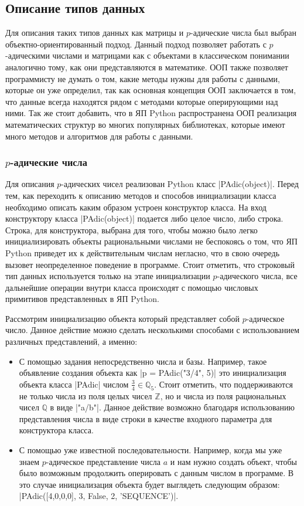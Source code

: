 \documentclass[master, och, diploma, times]{sty/SCWorks}
\theoremstyle{plain}
\theoremstyle{definition}
\numberwithin{equation}{section}
\begin{document}
\subsection{Описание типов данных}

Для описания таких типов данных как матрицы и $p$-адические числа был выбран объектно-ориентированный подход. Данный подход позволяет работать с $p$-адическими числами и матрицами как с объектами в классическом понимании аналогично тому, как они представляются в математике. ООП также позволяет программисту не думать о том, какие методы нужны для работы с данными, которые он уже определил, так как основная концепция ООП заключается в том, что данные всегда находятся рядом с методами которые оперирующими над ними. Так же стоит добавить, что в ЯП Python распространена ООП реализация математических структур во многих популярных библиотеках, которые имеют много методов и алгоритмов для работы с данными.

\subsubsection{$p$-адические числа}

Для описания $p$-адических чисел реализован Python класс |PAdic(object)|. Перед тем, как переходить к описанию методов и способов инициализации класса необходимо описать каким образом устроен конструктор класса. На вход конструктору класса |PAdic(object)| подается либо целое число, либо строка. Строка, для конструктора, выбрана для того, чтобы можно было легко инициализировать объекты рациональными числами не беспокоясь о том, что ЯП Python приведет их к действительным числам негласно, что в свою очередь вызовет неопределенное поведение в программе. Стоит отметить, что строковый тип данных используется только на этапе инициализации $p$-адического числа, все дальнейшие операции внутри класса происходят с помощью числовых примитивов представленных в ЯП Python.

Рассмотрим инициализацию объекта который представляет собой $p$-адическое число. Данное действие можно сделать несколькими способами с использованием различных представлений, а именно:

 \begin{itemize}
 \item С помощью задания непосредственно числа и базы. Например, такое объявление создания объекта как |p = PAdic("3/4", 5)| это инициализация объекта класса |PAdic| числом \mbox{$\frac{3}{4} \in \mathbb{Q}_5$}. Стоит отметить, что поддерживаются не \mbox{только} числа из поля целых чисел $\mathbb{Z}$, но и числа из поля рациональных чисел $\mathbb{Q}$ в виде |"a/b"|. Данное действие возможно благодаря использованию представления числа в виде строки в качестве входного параметра для конструктора класса.
 \item С помощью уже известной последовательности. Например, когда мы уже знаем $p$-адическое представление числа $a$ и нам нужно создать объект, чтобы было возможным продолжить оперировать с данным числом в программе. В это случае инициализация объекта будет выглядеть следующим образом: |PAdic({[4,0,0,0], 3, False}, 2, 'SEQUENCE')|.
 \end{itemize}
\end{document}
